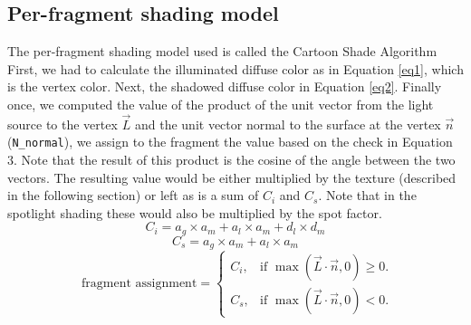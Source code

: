 \documentclass[12pt,a4paper]{article}
\begin{document}
\subsection{Per-fragment shading model}
The per-fragment shading model used is called the Cartoon Shade Algorithm \cite{shade}
First, we had to calculate the illuminated diffuse color as in Equation \ref{eq1}, which is the vertex color. Next, the shadowed diffuse color in Equation \ref{eq2}. Finally once, we computed the value of the product of the unit vector from the light source to the vertex $\overrightarrow{L}$ and the unit vector
normal to the surface at the vertex  $\overrightarrow{n}$ (\texttt{N\_normal}), we assign to the fragment the value based on the check in Equation 3. Note that the result of this product is the cosine of the angle between the two vectors. The resulting value would be either multiplied by the texture (described in the following section) or left as is a sum of $C_i$ and  $C_s$. Note that in the spotlight shading these would also be multiplied by the spot factor. 
\begin{equation}\label{eq1}
C_i = a_g \times a_m + a_l \times a_m + d_l \times d_m  
\end{equation}
\begin{equation}\label{eq2}
C_s =  a_g \times a_m + a_l \times a_m
\end{equation}
\begin{equation}\label{eq3}
\text{ fragment assignment} =\begin{cases}
    C_i, & \text{if $\max(\overrightarrow{L} \cdot \overrightarrow{n}, 0)\geq0$}.\\
    C_s, & \text{if $\max(\overrightarrow{L} \cdot \overrightarrow{n}, 0)<0$}.
  \end{cases}
\end{equation}
\end{document}
